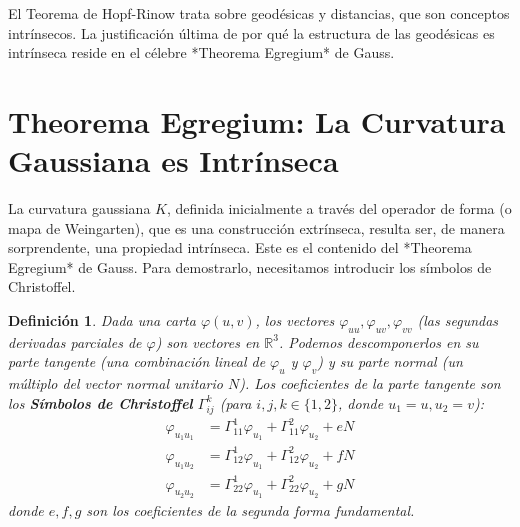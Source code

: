 \documentclass[12pt, a4paper]{report}
\theoremstyle{miestilo}
\theoremstyle{midefinicion}
\newtheorem{definicion}[teorema]{Definición}
\begin{document}
El Teorema de Hopf-Rinow trata sobre geodésicas y distancias, que son conceptos intrínsecos. La justificación última de por qué la estructura de las geodésicas es intrínseca reside en el célebre *Theorema Egregium* de Gauss.

\section{Theorema Egregium: La Curvatura Gaussiana es Intrínseca}

La curvatura gaussiana $K$, definida inicialmente a través del operador de forma (o mapa de Weingarten), que es una construcción extrínseca, resulta ser, de manera sorprendente, una propiedad intrínseca. Este es el contenido del *Theorema Egregium* de Gauss. Para demostrarlo, necesitamos introducir los símbolos de Christoffel.

\begin{definicion}
Dada una carta $\varphi(u,v)$, los vectores $\varphi_{uu}, \varphi_{uv}, \varphi_{vv}$ (las segundas derivadas parciales de $\varphi$) son vectores en $\mathbb{R}^3$. Podemos descomponerlos en su parte tangente (una combinación lineal de $\varphi_u$ y $\varphi_v$) y su parte normal (un múltiplo del vector normal unitario $N$). Los coeficientes de la parte tangente son los \textbf{Símbolos de Christoffel} $\Gamma_{ij}^k$ (para $i,j,k \in \{1,2\}$, donde $u_1=u, u_2=v$):
\begin{align*}
\varphi_{u_1 u_1} &= \Gamma_{11}^1 \varphi_{u_1} + \Gamma_{11}^2 \varphi_{u_2} + e N \\
\varphi_{u_1 u_2} &= \Gamma_{12}^1 \varphi_{u_1} + \Gamma_{12}^2 \varphi_{u_2} + f N \\
\varphi_{u_2 u_2} &= \Gamma_{22}^1 \varphi_{u_1} + \Gamma_{22}^2 \varphi_{u_2} + g N
\end{align*}
donde $e, f, g$ son los coeficientes de la segunda forma fundamental.
\end{definicion}
\end{document}
